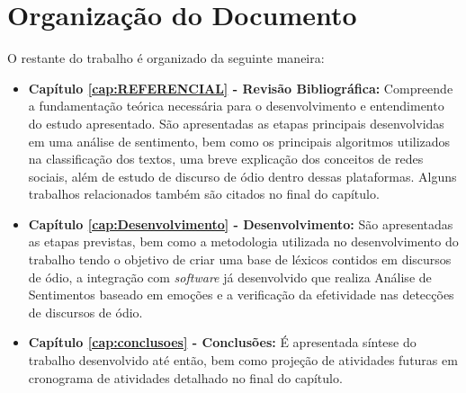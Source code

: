 \section{Organização do Documento}
O restante do trabalho é organizado da seguinte maneira:

\begin{itemize}

\item \textbf{Capítulo \ref{cap:REFERENCIAL} - Revisão Bibliográfica:} Compreende a fundamentação teórica necessária para o desenvolvimento e entendimento do estudo apresentado. São apresentadas as etapas principais desenvolvidas em uma análise de sentimento, bem como os principais algoritmos utilizados na classificação dos textos, uma breve explicação dos conceitos de redes sociais, além de estudo de discurso de ódio dentro dessas plataformas. Alguns trabalhos relacionados também são citados no final do capítulo.

\item \textbf{Capítulo \ref{cap:Desenvolvimento} - Desenvolvimento:} São apresentadas as etapas previstas, bem como a metodologia utilizada no desenvolvimento do trabalho tendo o objetivo de criar uma base de léxicos contidos em discursos de ódio, a integração com \textit{software} já desenvolvido que realiza Análise de Sentimentos baseado em emoções e a verificação da efetividade nas detecções de discursos de ódio.

\item \textbf{Capítulo \ref{cap:conclusoes} - Conclusões:} É apresentada síntese do trabalho desenvolvido até então, bem como projeção de atividades futuras em cronograma de atividades detalhado no final do capítulo.
\end{itemize}
